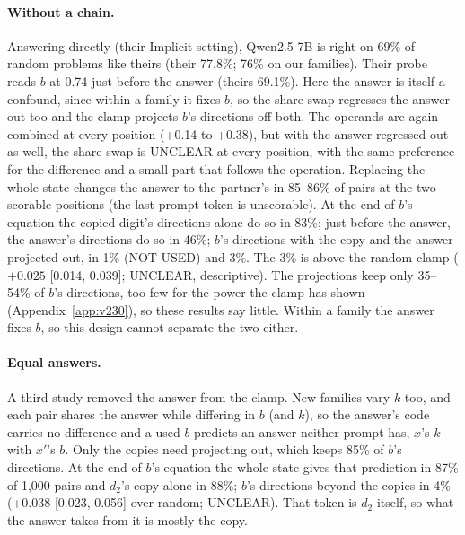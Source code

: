 \documentclass{article}
\begin{document}
\paragraph{Without a chain.} Answering directly (their Implicit setting), Qwen2.5-7B is right on 69\% of random problems like theirs (their 77.8\%; 76\% on our families). Their probe reads $b$ at 0.74 just before the answer (theirs 69.1\%). Here the answer is itself a confound, since within a family it fixes $b$, so the share swap regresses the answer out too and the clamp projects $b$'s directions off both. The operands are again combined at every position (+0.14 to +0.38), but with the answer regressed out as well, the share swap is UNCLEAR at every position, with the same preference for the difference and a small part that follows the operation. Replacing the whole state changes the answer to the partner's in 85--86\% of pairs at the two scorable positions (the last prompt token is unscorable). At the end of $b$'s equation the copied digit's directions alone do so in 83\%; just before the answer, the answer's directions do so in 46\%; $b$'s directions with the copy and the answer projected out, in 1\% (NOT-USED) and 3\%. The 3\% is above the random clamp ($+0.025$ [0.014, 0.039]; UNCLEAR, descriptive). The projections keep only 35--54\% of $b$'s directions, too few for the power the clamp has shown (Appendix~\ref{app:v230}), so these results say little. Within a family the answer fixes $b$, so this design cannot separate the two either.

\paragraph{Equal answers.} A third study removed the answer from the clamp. New families vary $k$ too, and each pair shares the answer while differing in $b$ (and $k$), so the answer's code carries no difference and a used $b$ predicts an answer neither prompt has, $x$'s $k$ with $x'$'s $b$. Only the copies need projecting out, which keeps 85\% of $b$'s directions. At the end of $b$'s equation the whole state gives that prediction in 87\% of 1,000 pairs and $d_2$'s copy alone in 88\%; $b$'s directions beyond the copies in 4\% (+0.038 [0.023, 0.056] over random; UNCLEAR). That token is $d_2$ itself, so what the answer takes from it is mostly the copy.
\end{document}
